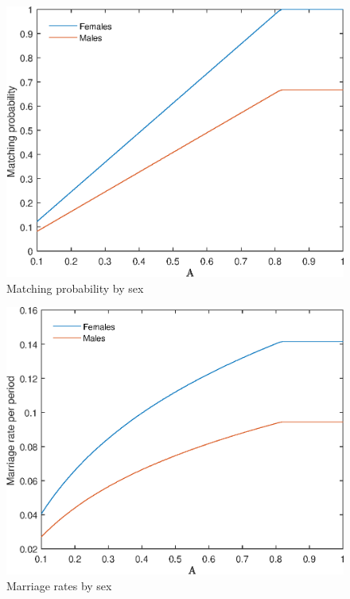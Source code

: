 \documentclass[12pt]{article}
\begin{document}
\begin{figure}
	\centering
	\caption{Matching probability by sex}
	\includegraphics{Graphs/match_prob_A_ex1.eps}
\end{figure}

\begin{figure}
	\centering
	\caption{Marriage rates by sex}
	\includegraphics{Graphs/marr_rates_A_ex1.eps}
\end{figure}
\end{document}
